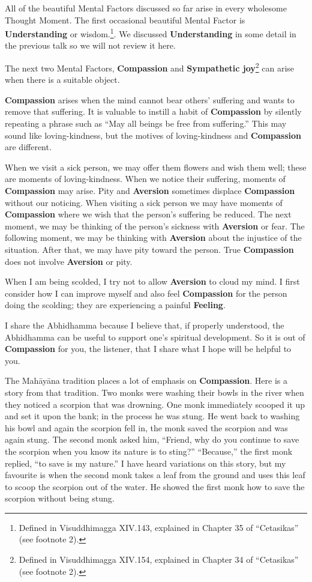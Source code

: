 All of the beautiful Mental Factors discussed so far arise in every wholesome Thought Moment. The first occasional beautiful Mental Factor is \textbf{Understanding} or wisdom.\footnote{Defined in Visuddhimagga XIV.143, explained in Chapter 35 of “Cetasikas” (see footnote 2).}. We discussed \textbf{Understanding} in some detail in the previous talk so we will not review it here.

The next two Mental Factors, \textbf{Compassion} and \textbf{Sympathetic joy}\footnote{Defined in Visuddhimagga XIV.154, explained in Chapter 34 of “Cetasikas” (see footnote 2).} can arise when there is a suitable object.

\textbf{Compassion} arises when the mind cannot bear others’ suffering and wants to remove that suffering. It is valuable to instill a habit of \textbf{Compassion} by silently repeating a phrase such as “May all beings be free from suffering.” This may sound like loving-kindness, but the motives of loving-kindness and \textbf{Compassion} are different.

When we visit a sick person, we may offer them flowers and wish them well; these are moments of loving-kindness. When we notice their suffering, moments of \textbf{Compassion} may arise. Pity and \textbf{Aversion} sometimes displace \textbf{Compassion} without our noticing. When visiting a sick person we may have moments of \textbf{Compassion} where we wish that the person’s suffering be reduced. The next moment, we may be thinking of the person’s sickness with \textbf{Aversion} or fear. The following moment, we may be thinking with \textbf{Aversion} about the injustice of the situation. After that, we may have pity toward the person. True \textbf{Compassion} does not involve \textbf{Aversion} or pity.

When I am being scolded, I try not to allow \textbf{Aversion} to cloud my mind. I first consider how I can improve myself and also feel \textbf{Compassion} for the person doing the scolding; they are experiencing a painful \textbf{Feeling}.

I share the Abhidhamma because I believe that, if properly understood, the Abhidhamma can be useful to support one’s spiritual development. So it is out of \textbf{Compassion} for you, the listener, that I share what I hope will be helpful to you.

The Mahāyāna tradition places a lot of emphasis on \textbf{Compassion}. Here is a story from that tradition. Two monks were washing their bowls in the river when they noticed a scorpion that was drowning. One monk immediately scooped it up and set it upon the bank; in the process he was stung. He went back to washing his bowl and again the scorpion fell in, the monk saved the scorpion and was again stung. The second monk asked him, “Friend, why do you continue to save the scorpion when you know its nature is to sting?” “Because,” the first monk replied, “to save is my nature.” I have heard variations on this story, but my favourite is when the second monk takes a leaf from the ground and uses this leaf to scoop the scorpion out of the water. He showed the first monk how to save the scorpion without being stung.

